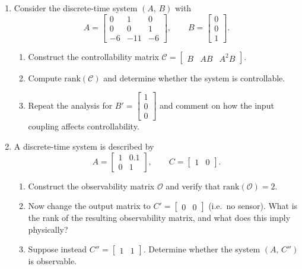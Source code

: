 \begin{enumerate}

\item Consider the discrete-time system $(A,\,B)$ with
\[
A = \begin{bmatrix} 0 & 1 & 0 \\ 0 & 0 & 1 \\ -6 & -11 & -6 \end{bmatrix}, \qquad
B = \begin{bmatrix} 0 \\ 0 \\ 1 \end{bmatrix}.
\]
\begin{enumerate}
	\item Construct the controllability matrix $\mathcal{C} = \begin{bmatrix} B & AB & A^2 B \end{bmatrix}$.
	\item Compute $\text{rank}(\mathcal{C})$ and determine whether the system is controllable.
	\item Repeat the analysis for $B' = \begin{bmatrix} 1 \\ 0 \\ 0 \end{bmatrix}$ and comment on how the input coupling affects controllability.
\end{enumerate}

\item A discrete-time system is described by
\[
A = \begin{bmatrix} 1 & 0.1 \\ 0 & 1 \end{bmatrix}, \qquad
C = \begin{bmatrix} 1 & 0 \end{bmatrix}.
\]
\begin{enumerate}
	\item Construct the observability matrix $\mathcal{O}$ and verify that $\text{rank}(\mathcal{O}) = 2$.
	\item Now change the output matrix to $C' = \begin{bmatrix} 0 & 0 \end{bmatrix}$ (i.e.\ no sensor). What is the rank of the resulting observability matrix, and what does this imply physically?
	\item Suppose instead $C'' = \begin{bmatrix} 1 & 1 \end{bmatrix}$. Determine whether the system $(A,\,C'')$ is observable.
\end{enumerate}


\end{enumerate}
